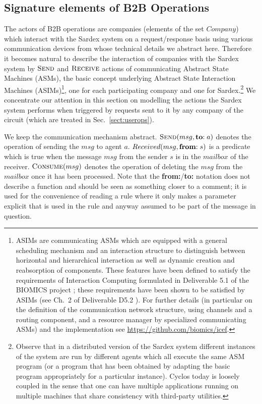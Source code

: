 \subsection{Signature elements of B2B Operations}
\label{signaturepaymtop}
The actors of B2B operations are companies (elements of the set $Company$) which interact with the Sardex system on a request/response basis using various communication devices from whose technical details we abstract here. Therefore it becomes natural to describe the interaction of companies with the Sardex system by $\hbox{\sc Send}$ and $\hbox{\sc Receive}$ actions of communicating Abstract State Machines (ASMs), the basic concept underlying Abstract State Interaction Machines (ASIMs)\footnote{ASIMs are communicating ASMs which are equipped with a general scheduling mechanism and an interaction structure to distinguish between horizontal and hierarchical interaction as well as dynamic creation and reabsorption of components. These features have been defined to satisfy the requirements of Interaction Computing formulated in Deliverable 5.1 of the BIOMICS project  \cite{BIOMICSD51}; these requirements have been shown to be satisfied by ASIMs (see Ch.\ 2 of Deliverable D5.2 \cite{BIOMICSD52}). For further details (in particular on the definition of the communication network structure, using channels and a routing component, and a resource manager by specialized communicating ASMs) and the implementation see \url{https://github.com/biomics/icef}.}, one for each participating company and one for Sardex.\footnote{Observe that in a distributed version of the Sardex system different instances of the system are run by different agents which all execute the same ASM program (or a program that has been obtained by adapting the basic program appropriately for a particular instance). Cyclos today is loosely coupled in the sense that one can have multiple applications running on multiple machines that share consistency with third-party utilities.} We concentrate our attention in this section on modelling the actions the Sardex system performs when triggered by requests sent to it by any company of the circuit (which are treated in Sec.~\ref{sect:userops}).

We keep the communication mechanism abstract. $\hbox{\sc Send}(msg,\mathrel{\mathbf{to}} :a)$ denotes the operation of sending the $msg$ to agent $a$. $Received(msg,\mathrel{\mathbf{from}} :s)$ is a predicate which is true when the message $msg$ from the sender $s$ is in the $mailbox$ of the receiver. $\hbox{\sc Consume}(msg)$ denotes the operation of deleting the $msg$ from the $mailbox$ once it has been processed. Note that the \textbf{from:}/\textbf{to:} notation does not describe a function and should be seen as something closer to a comment; it is used for the convenience of reading a rule where it only makes a parameter explicit that is used in the rule and anyway assumed to be part of the message in question.


